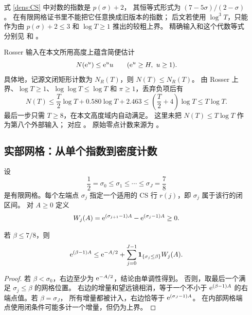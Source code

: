 式 \eqref{dens:CS} 中对数的指数是 $p(\sigma)+2$，
其恒等式形式为 $(7-5\sigma)/(2-\sigma)$。
在有限网格证书里不能把它任意换成旧版本的指数；
后文若使用 $\log^3T$，只能作为由
$p(\sigma)+2\leq3$ 和 $\log T\geq1$ 推出的较粗上界。
精确输入和这个代数等式分别见
 和
。

Rosser 输入在本文所用高度上蕴含简便估计
\begin{equation}\label{dens:rosser-simple}
 N(\mathrm e^u)\leq\mathrm e^u u\qquad(\mathrm e^u\geq H,\ u\geq1).
\end{equation}
具体地，记源文闭矩形计数为 $N_R(T)$，则 $N(T)\leq N_R(T)$。
由 Rosser 上界、$\log T\geq1$、$\log\log T\leq\log T$ 和
$\pi\geq1$，丢弃负项后有
\[
 N(T)\leq\frac T2\log T+0.580\log T+2.463
       \leq\left(\frac T2+4\right)\log T
       \leq T\log T.
\]
最后一步只需 $T\geq8$，在本文高度域内自动满足。
这里未把 $N(T)\leq T\log T$ 作为第八个外部输入；
对应 。
原始零点计数来源为 \cite{Rosser1941,Dusart2016}。

\subsection{实部网格：从单个指数到密度计数}

设
\[
 \frac12=\sigma_0\leq\sigma_1\leq\cdots\leq\sigma_J=\frac78
\]
是有限网格。每个左端点 $\sigma_j$ 指定一个适用的 CS 行
$r(j)$，即 $\sigma_j$ 属于该行的闭区间。
对 $A\geq0$ 定义
\begin{equation}\label{dens:weights}
 W_j(A)=\mathrm e^{(\sigma_{j+1}-1)A}
             -\mathrm e^{(\sigma_j-1)A}\geq0.
\end{equation}

\begin{lemma}[向上的阶梯界]\label{dens:staircase}
若 $\beta\leq7/8$，则
\begin{equation}\label{dens:staircase-eq}
 \mathrm e^{(\beta-1)A}\leq
 \mathrm e^{-A/2}+
 \sum_{j=0}^{J-1}\mathbf{1}_{\{\sigma_j\leq\beta\}}W_j(A).
\end{equation}
\end{lemma}
\begin{proof}
若 $\beta<\sigma_0$，右边至少为 $\mathrm e^{-A/2}$，结论由单调性得到。
否则，取最后一个满足 $\sigma_j\leq\beta$ 的网格位置。
右边的增量和望远镜相消，等于一个不小于
$\mathrm e^{(\beta-1)A}$ 的右端点值。若 $\beta=\sigma_J$，
所有增量都被计入，右边恰等于 $\mathrm e^{(\sigma_J-1)A}$。
在内部网格端点使用闭条件可能多计一个增量，但仍为上界。
\end{proof}

